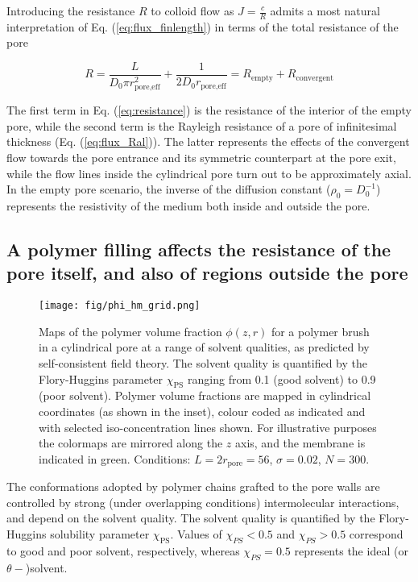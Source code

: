 \documentclass[12pt, a4paper]{article}
\begin{document}
Introducing the resistance $R$ to colloid flow as $J=\frac{c}{R}$ admits a most natural interpretation of Eq. (\ref{eq:flux_finlength}) in terms of the total resistance of the pore

\begin{equation}
    R=\frac{L}{D_0\pi r_{\text{pore,eff}}^{2}}+\frac{1}{2D_0r_{\text{pore,eff}}}=R_{\text{empty}}+R_{\text{convergent}}
    \label{eq:resistance}
\end{equation}

\noindent The first term in Eq. (\ref{eq:resistance}) is the resistance of the interior of the empty pore, 
while the second term is the Rayleigh resistance of a pore of infinitesimal thickness (Eq. (\ref{eq:flux_Ral})). 
The latter represents the effects of the convergent flow towards the pore entrance and its symmetric counterpart at the pore exit, 
while the flow lines inside the cylindrical pore turn out to be approximately axial. 
In the empty pore scenario, the inverse of the diffusion constant ($\rho_0=D_0^{-1}$) represents the resistivity of the medium both inside and outside the pore. 

\subsection{A polymer filling affects the resistance of the pore itself, and also of regions outside the pore}

\begin{figure}
    \centering
    \texttt{[image: fig/phi\_hm\_grid.png]}
    \caption{
    Maps of the polymer volume fraction $\phi(z,r)$ for a polymer brush in a cylindrical pore at a range of solvent qualities, as predicted by self-consistent field theory. 
    The solvent quality is quantified by the Flory-Huggins parameter $\chi_{\text{PS}}$ ranging from 0.1 (good solvent) to 0.9 (poor solvent).
    Polymer volume fractions are mapped in cylindrical coordinates (as shown in the inset), colour coded as indicated and with selected iso-concentration lines shown. 
    For illustrative purposes the colormaps are mirrored along the $z$ axis, and the membrane is indicated in green.
    Conditions: $L=2r_{\text{pore}}=56$, $\sigma=0.02$, $N=300$.
    }
    \label{fig:phi_hm_grid}
\end{figure}

The conformations adopted by polymer chains grafted to the pore walls are controlled by strong (under overlapping conditions) intermolecular interactions, and depend on the solvent quality. 
The solvent quality is quantified by the Flory-Huggins solubility parameter $\chi_{\text{PS}}$. 
Values of $\chi_{PS}<0.5$ and $\chi_{PS}>0.5$ correspond to good and poor solvent, respectively, whereas $\chi_{PS}=0.5$ represents the ideal (or $\theta-$)solvent.
\end{document}
